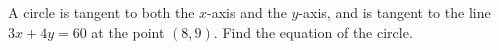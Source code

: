 A circle is tangent to both the $x$-axis and the $y$-axis, and is tangent to the line $3x+4y=60$ at the point $(8,9)$. Find the equation of the circle.
